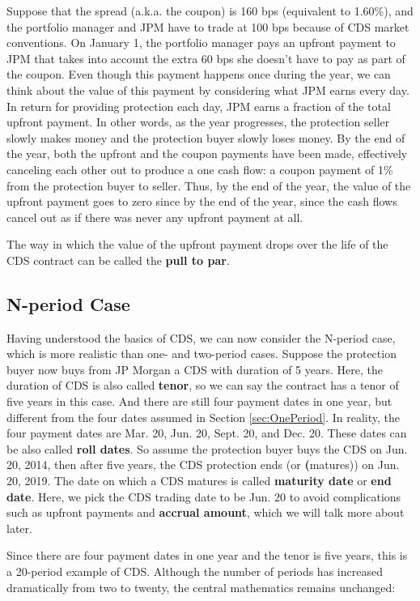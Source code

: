 \documentclass{jss}
\begin{document}
Suppose that the spread (a.k.a. the coupon) is 160 bps (equivalent to 1.60\%), and the portfolio manager and JPM have to trade at 100 bps because of CDS market conventions. On January 1, the portfolio manager pays an upfront payment to JPM that takes into account the extra 60 bps she doesn't have to pay as part of the coupon. Even though this payment happens once during the year, we can think about the value of this payment by considering what JPM earns every day. In return for providing protection each day, JPM earns a fraction of the total upfront payment. In other words, as the year progresses, the protection seller slowly makes money and the protection buyer slowly loses money. By the end of the year, both the upfront and the coupon payments have been made, effectively canceling each other out to produce a one cash flow: a coupon payment of 1\% from the protection buyer to seller. Thus, by the end of the year, the value of the upfront payment goes to zero since by the end of the year, since the cash flows cancel out as if there was never any upfront payment at all. 

The way in which the value of the upfront payment drops over the life of the CDS contract can be called the \textbf{pull to par}.

\subsection{N-period Case}
\label{sec:nPeriodCase}

Having understood the basics of CDS, we can now consider the N-period case, which is more realistic than one- and two-period cases. Suppose the protection buyer now buys from JP Morgan a CDS with duration of 5 years. Here, the duration of CDS is also called \textbf{tenor}, so we can say the contract has a tenor of five years in this case. And there are still four payment dates in one year, but different from the four dates assumed in Section \ref{sec:OnePeriod}. In reality, the four payment dates are Mar. 20, Jun. 20, Sept. 20, and Dec. 20. These dates can be also called \textbf{roll dates}. So assume the protection buyer buys the CDS on Jun. 20, 2014, then after five years, the CDS protection ends (or \textbf(matures)) on Jun. 20, 2019. The date on which a CDS matures is called \textbf{maturity date} or \textbf{end date}. Here, we pick the CDS trading date to be Jun. 20 to avoid complications such as upfront payments and \textbf{accrual amount}, which we will talk more about later.

Since there are four payment dates in one year and the tenor is five years, this is a 20-period example of CDS.
Although the number of periods has increased dramatically from two to twenty, the central mathematics remains unchanged:
\end{document}
